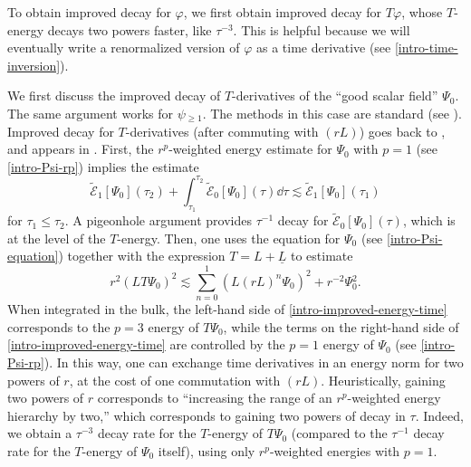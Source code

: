 \documentclass[10pt, reqno]{amsart}
\begin{document}
To obtain improved decay for \(\varphi{}\), we first obtain improved decay for
\(T\varphi{}\), whose \(T\)-energy decays two powers faster, like \(\tau^{-3}\).
This is helpful because we will eventually write a renormalized version of
\(\varphi{}\) as a time derivative (see \cref{intro-time-inversion}).

We first discuss the improved decay of \(T\)-derivatives of the ``good scalar
field'' \(\Psi_0\). The same argument works for \(\psi{}_{\ge 1}\). The methods
in this case are standard (see \cite[Sec.~8]{GAJIC2023110058}). Improved decay for
\(T\)-derivatives (after commuting with \((rL)\)) goes back to
\cite{Schlue_2013,moschidis-rp}, and appears in
\cite{Angelopoulos2018-dz,MR3725885,ANGELOPOULOS2023108939}. First, the
\(r^p\)-weighted energy estimate for \(\Psi_0\) with \(p = 1\) (see
\cref{intro-Psi-rp}) implies the estimate
\begin{equation}\label{intro-Psi-0-1-integrated}
\tilde{\mathcal{E}}_1[\Psi{}_0](\tau{}_2) + \int_{\tau{}_1}^{\tau{}_2} \tilde{\mathcal{E}}_0[\Psi{}_0](\tau{})\dd{}\tau{}\lesssim \tilde{\mathcal{E}}_1[\Psi{}_0](\tau{}_1)
\end{equation}
for \(\tau_1\le \tau_2\). A pigeonhole argument provides \(\tau^{-1}\) decay for
\(\tilde{\mathcal{E}}_0[\Psi_0](\tau{})\), which is at the level of the
\(T\)-energy. Then, one uses the equation for \(\Psi_0\) (see
\cref{intro-Psi-equation}) together with the expression \(T = L + \underline{L}\)
to estimate
\begin{equation}\label{intro-improved-energy-time}
r^2(LT\Psi{}_0)^2 \lesssim \sum_{n=0}^1 (L(rL)^n\Psi{}_0)^2 + r^{-2}\Psi{}_0^2.
\end{equation}
When integrated in the bulk, the left-hand side of
\cref{intro-improved-energy-time} corresponds to the \(p = 3\) energy of
\(T\Psi_0\), while the terms on the right-hand side of
\cref{intro-improved-energy-time} are controlled by the \(p = 1\) energy of
\(\Psi_0\) (see \cref{intro-Psi-rp}). In this way, one can exchange time
derivatives in an energy norm for two powers of \(r\), at the cost of one
commutation with \((rL)\). Heuristically, gaining two powers of \(r\)
corresponds to ``increasing the range of an \(r^p\)-weighted energy hierarchy by
two,'' which corresponds to gaining two powers of decay in \(\tau{}\). Indeed, we
obtain a \(\tau^{-3}\) decay rate for the \(T\)-energy of \(T\Psi_0\) (compared
to the \(\tau^{-1}\) decay rate for the \(T\)-energy of \(\Psi_0\) itself),
using only \(r^p\)-weighted energies with \(p = 1\).
\end{document}
